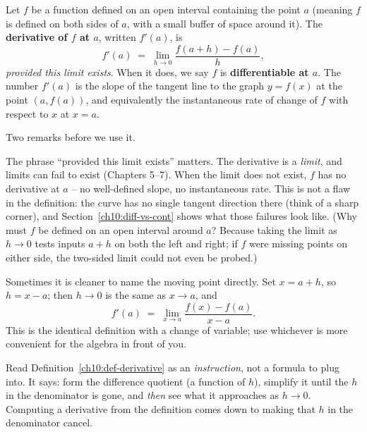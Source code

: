 \begin{definition}
\label{ch10:def-derivative}
Let $f$ be a function defined on an open interval containing the point $a$
(meaning $f$ is defined on both sides of $a$, with a small buffer of space around
it). The \textbf{derivative of $f$ at $a$}, written $f'(a)$, is
\[
  f'(a) \;=\; \lim_{h \to 0} \frac{f(a + h) - f(a)}{h},
\]
\emph{provided this limit exists}. When it does, we say $f$ is
\textbf{differentiable at $a$}. The number $f'(a)$ is the slope of the tangent
line to the graph $y = f(x)$ at the point $(a, f(a))$, and equivalently the
instantaneous rate of change of $f$ with respect to $x$ at $x = a$.
\end{definition}

Two remarks before we use it.

\begin{remark}
The phrase ``provided this limit exists'' matters. The derivative is a
\emph{limit}, and limits can fail to exist (Chapters 5--7). When the limit does
not exist, $f$ has no derivative at $a$ -- no well-defined slope, no instantaneous
rate. This is not a flaw in the definition: the curve has no single tangent direction there (think of a sharp corner),
and Section~\ref{ch10:diff-vs-cont} shows what those failures look like.
(Why must $f$ be defined on an open interval around $a$? Because taking the limit
as $h \to 0$ tests inputs $a+h$ on both the left and right; if $f$ were missing
points on either side, the two-sided limit could not even be probed.)
\end{remark}

\begin{remark}
\label{ch10:def-equiv}
Sometimes it is cleaner to name the moving point directly. Set $x = a + h$, so
$h = x - a$; then $h \to 0$ is the same as $x \to a$, and
\[
  f'(a) \;=\; \lim_{x \to a} \frac{f(x) - f(a)}{x - a}.
\]
This is the identical definition with a change of variable; use whichever is more
convenient for the algebra in front of you.
\end{remark}

\begin{focusbox}
Read Definition~\ref{ch10:def-derivative} as an \emph{instruction}, not a formula
to plug into. It says: form the difference quotient (a function of $h$), simplify
it until the $h$ in the denominator is gone, and \emph{then} see what it
approaches as $h \to 0$. Computing a derivative from the definition comes down
to making that $h$ in the denominator cancel.
\end{focusbox}

